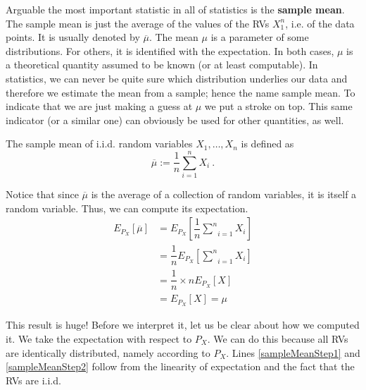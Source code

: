 Arguable the most important statistic in all of statistics is the \textbf{sample mean}. The sample mean is just the average of the
values of the RVs $ X_{1}^{n} $, i.e. of the data points. It is usually denoted by $ \overline{\mu} $. The mean $ \mu $ is a parameter of some
distributions. For others, it is identified with the expectation. In both cases, $ \mu $ is a theoretical quantity assumed to be known
(or at least computable). In statistics, we can never be quite sure which distribution underlies our data and therefore we estimate
the mean from a sample; hence the name sample mean. To indicate that we are just making a guess at $ \mu $ we put a stroke on top.
This same indicator (or a similar one) can obviously be used for other quantities, as well.

\begin{Definition}
The sample mean of i.i.d. random variables $ X_{1}, \ldots, X_{n} $ is defined as 
$$ \overline{\mu} := \dfrac{1}{n}\underset{i=1}{\overset{n}{\sum}} X_{i} \ . $$
\end{Definition}

Notice that since $ \overline{\mu} $ is the average of a collection of random variables, it is itself a random variable. Thus, we can
compute its expectation.
\begin{align}
E_{P_{X}}[\overline{\mu}] &= E_{P_{X}}\left[\dfrac{1}{n} \underset{i=1}{\overset{n}{\sum}} X_{i}\right] \\
&= \dfrac{1}{n} E_{P_{X}}\left[\underset{i=1}{\overset{n}{\sum}} X_{i}\right] \label{sampleMeanStep1} \\
&= \dfrac{1}{n} \times n E_{P_{X}}[X] \label{sampleMeanStep2} \\
&= E_{P_{X}}[X] = \mu
\end{align}

This result is huge! Before we interpret it, let us be clear about how we computed it. We take the expectation with respect to
$ P_{X} $. We can do this because all RVs are identically distributed, namely according to $ P_{X} $. Lines \ref{sampleMeanStep1} and
\ref{sampleMeanStep2} follow from the linearity of expectation and the fact that the RVs are i.i.d. 

